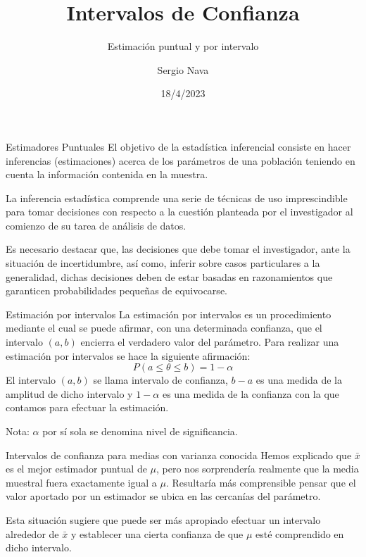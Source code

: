 \documentclass[
  10pt,
  ignorenonframetext,
]{beamer}
\title{Intervalos de Confianza}
\subtitle{Estimación puntual y por intervalo}
\author{Sergio Nava}
\date{18/4/2023}
\begin{document}
\frame{\titlepage}

\begin{frame}[allowframebreaks]
  \tableofcontents[hideallsubsections]
\end{frame}
\begin{frame}{Estimadores Puntuales}
\protect\hypertarget{estimadores-puntuales}{}
El objetivo de la estadística inferencial consiste en hacer inferencias
(estimaciones) acerca de los parámetros de una población teniendo en
cuenta la información contenida en la muestra.

La inferencia estadística comprende una serie de técnicas de uso
imprescindible para tomar decisiones con respecto a la cuestión
planteada por el investigador al comienzo de su tarea de análisis de
datos.

Es necesario destacar que, las decisiones que debe tomar el
investigador, ante la situación de incertidumbre, así como, inferir
sobre casos particulares a la generalidad, dichas decisiones deben de
estar basadas en razonamientos que garanticen probabilidades pequeñas de
equivocarse.
\end{frame}

\begin{frame}{Estimación por intervalos}
\protect\hypertarget{estimaciuxf3n-por-intervalos}{}
La estimación por intervalos es un procedimiento mediante el cual se
puede afirmar, con una determinada confianza, que el intervalo \((a,b)\)
encierra el verdadero valor del parámetro. Para realizar una estimación
por intervalos se hace la siguiente afirmación:
\[P(a\le \theta \le b)=1-\alpha\] El intervalo \((a,b)\) se llama
intervalo de confianza, \(b - a\) es una medida de la amplitud de dicho
intervalo y \(1-\alpha\) es una medida de la confianza con la que
contamos para efectuar la estimación.

Nota: \(\alpha\) por sí sola se denomina nivel de significancia.
\end{frame}

\begin{frame}{Intervalos de confianza para medias con varianza conocida}
\protect\hypertarget{intervalos-de-confianza-para-medias-con-varianza-conocida}{}
Hemos explicado que \(\bar{x}\) es el mejor estimador puntual de
\(\mu\), pero nos sorprendería realmente que la media muestral fuera
exactamente igual a \(\mu\). Resultaría más comprensible pensar que el
valor aportado por un estimador se ubica en las cercanías del parámetro.

Esta situación sugiere que puede ser más apropiado efectuar un intervalo
alrededor de \(\bar{x}\) y establecer una cierta confianza de que
\(\mu\) esté comprendido en dicho intervalo.
\end{frame}
\end{document}
